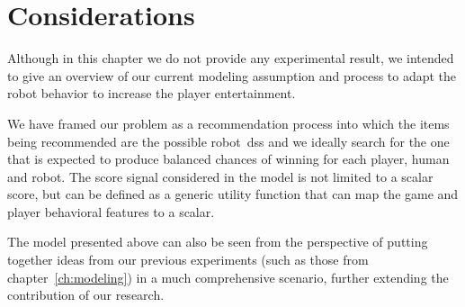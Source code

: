 \section{Considerations}
Although in this chapter we do not provide any experimental result, we intended to give an overview of our current modeling assumption and process to adapt the robot behavior to increase the player entertainment.

We have framed our problem as a recommendation process into which the items being recommended are the possible robot~\glsdesc{ds}s and we ideally search for the one that is expected to produce balanced chances of winning for each player, \ie human and robot. The score signal considered in the model is not limited to a scalar score, but can be defined as a generic utility function that can map the game and player behavioral features to a scalar. 

The model presented above can also be seen from the perspective of putting together ideas from our previous experiments (such as those from chapter~\ref{ch:modeling}) in a much comprehensive scenario, further extending the contribution of our research.